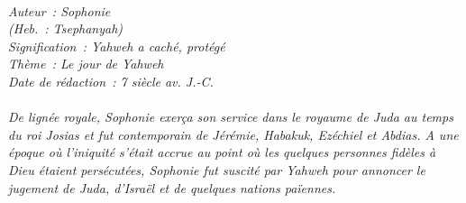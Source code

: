 \BFont
\noindent\hrulefill
{\footnotesize
\textit{
\bigskip
{\centering{}
\\Auteur~: Sophonie
\\(Heb.~: Tsephanyah)
\\Signification~: Yahweh a caché, protégé
\\Thème~: Le jour de Yahweh
\\Date de rédaction~: 7 siècle av. J.-C.\\}
}
\textit{
\\De lignée royale, Sophonie exerça son service dans le royaume de Juda au temps du roi Josias et fut contemporain de Jérémie, Habakuk, Ezéchiel et Abdias. A une époque où l'iniquité s'était accrue au point où les quelques personnes fidèles à Dieu étaient persécutées, Sophonie fut suscité par Yahweh pour annoncer le jugement de Juda, d'Israël et de quelques nations païennes.\bigskip
}
}
\par\nobreak\noindent\hrulefill
